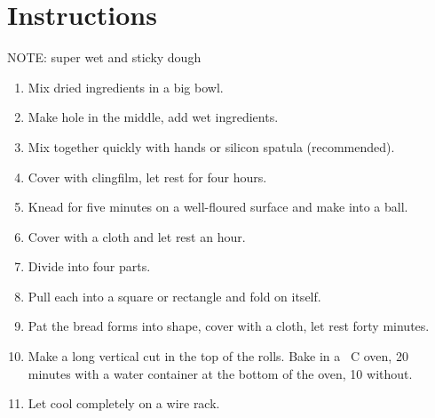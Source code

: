 \documentclass[main.tex]{subfiles}
\begin{document}
\section{Instructions}

NOTE: super wet and sticky dough
\begin{enumerate}
    \item Mix dried ingredients in a big bowl.
    \item Make hole in the middle, add wet ingredients.
    \item Mix together quickly with hands or silicon spatula (recommended).
    \item Cover with clingfilm, let rest for four hours.
    \item Knead for five minutes on a well-floured surface and make into a ball.
    \item Cover with a cloth and let rest an hour.
    \item Divide into four parts.
    \item Pull each into a square or rectangle and fold on itself.
    \item Pat the bread forms into shape, cover with a cloth, let rest forty minutes.
    \item Make a long vertical cut in the top of the rolls. Bake in a \unit[200]{\textdegree C} oven, 20 minutes with a water container at the bottom of the oven, 10 without.
    \item Let cool completely on a wire rack.
\end{enumerate}


\end{document}
